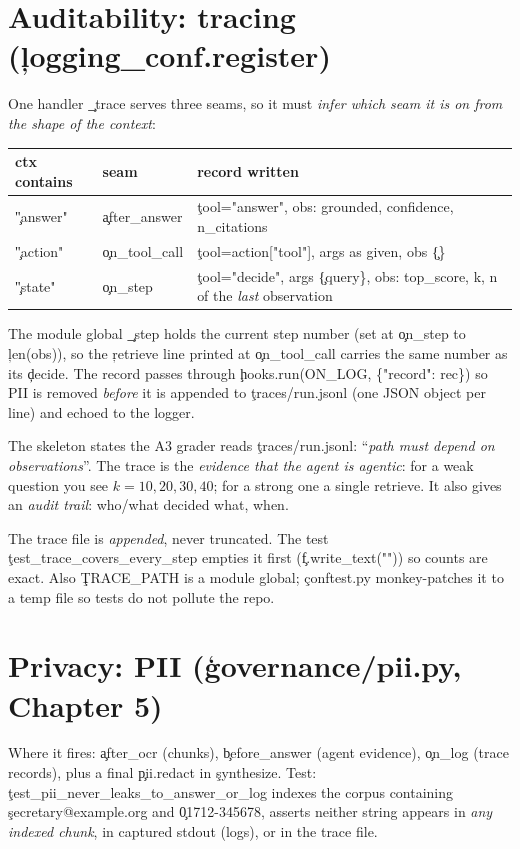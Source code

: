 \section{Auditability: tracing (\c{logging\_conf.register})}
One handler \c{\_trace} serves three seams, so it must \emph{infer which seam it is on from the shape of the context}:
\begin{center}\begin{tabular}{@{}lll@{}}\toprule ctx contains & seam & record written \\ \midrule
\c{"answer"} & \c{after\_answer} & \c{tool="answer"}, obs: grounded, confidence, n\_citations \\
\c{"action"} & \c{on\_tool\_call} & \c{tool=action["tool"]}, args as given, obs \c{\{\}} \\
\c{"state"} & \c{on\_step} & \c{tool="decide"}, args \c{\{query\}}, obs: top\_score, k, n of the \emph{last} observation \\
\bottomrule\end{tabular}\end{center}
The module global \c{\_step} holds the current step number (set at \c{on\_step} to \c{len(obs)}), so the \c{retrieve} line printed at \c{on\_tool\_call} carries the same number as its \c{decide}. The record passes through \c{hooks.run(ON\_LOG, \{"record": rec\})} so PII is removed \emph{before} it is appended to \c{traces/run.jsonl} (one JSON object per line) and echoed to the logger.
\begin{why}
The skeleton states the A3 grader reads \c{traces/run.jsonl}: ``\emph{path must depend on observations}''. The trace is the \emph{evidence that the agent is agentic}: for a weak question you see $k=10,20,30,40$; for a strong one a single retrieve. It also gives an \emph{audit trail}: who/what decided what, when.
\end{why}
\begin{gotcha}
The trace file is \emph{appended}, never truncated. The test \c{test\_trace\_covers\_every\_step} empties it first (\c{f.write\_text("")}) so counts are exact. Also \c{TRACE\_PATH} is a module global; \c{conftest.py} monkey-patches it to a temp file so tests do not pollute the repo.
\end{gotcha}

\section{Privacy: PII (\c{governance/pii.py}, Chapter 5)}
Where it fires: \c{after\_ocr} (chunks), \c{before\_answer} (agent evidence), \c{on\_log} (trace records), plus a final \c{pii.redact} in \c{synthesize}. Test: \c{test\_pii\_never\_leaks\_to\_answer\_or\_log} indexes the corpus containing \c{secretary@example.org} and \c{01712-345678}, asserts neither string appears in \emph{any indexed chunk}, in captured stdout (logs), or in the trace file.

